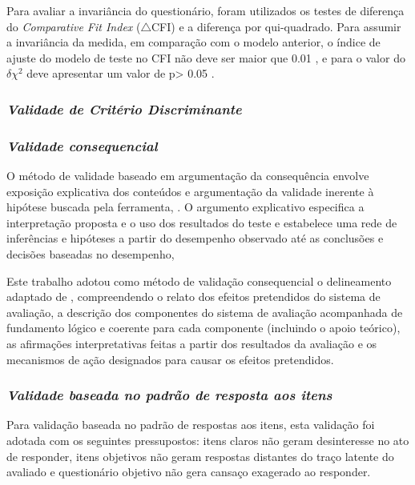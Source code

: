 Para avaliar a invariância do questionário, foram utilizados os testes de diferença do \textit{Comparative Fit Index} ($\triangle$CFI) e a diferença por qui-quadrado. Para assumir a invariância da medida, em comparação com o modelo anterior, o índice de ajuste do modelo de teste no CFI não deve ser maior que 0.01 \cite{Cheung2002EvaluatingInvariance}, e para o valor do $\delta\chi^2$  deve apresentar um valor de p> 0.05 \cite{Milfont2010TestingResearch.}.

\subsubsection{\textit{Validade de Critério Discriminante}}

\subsubsection{\textit{Validade consequencial}}

O método de validade baseado em argumentação da consequência envolve exposição explicativa dos conteúdos e argumentação da validade inerente à hipótese buscada pela ferramenta, \cite{Kane2010}. O argumento explicativo especifica a interpretação proposta e o uso dos resultados do teste e estabelece uma rede de inferências e hipóteses a partir do desempenho observado até as conclusões e decisões baseadas no desempenho, 

Este trabalho adotou como método de validação consequencial o delineamento adaptado de , compreendendo o relato dos efeitos pretendidos do sistema de avaliação, a descrição dos componentes do sistema de avaliação acompanhada de fundamento lógico e coerente para cada componente (incluindo o apoio teórico), as afirmações interpretativas feitas a partir dos resultados da avaliação e os mecanismos de ação designados para causar os efeitos pretendidos.

\subsubsection{\textit{Validade baseada no padrão de resposta aos itens}}

Para validação baseada no padrão de respostas aos itens, esta validação foi adotada com os seguintes pressupostos: itens claros não geram desinteresse no ato de responder, itens objetivos não geram respostas distantes do traço latente do avaliado e questionário objetivo não gera cansaço exagerado ao responder.



